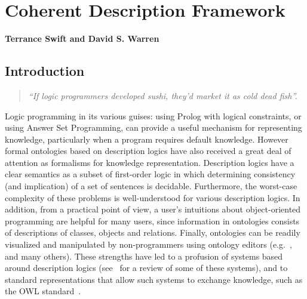 \newcommand{\pnot}{\mbox{$\backslash +$}}
\newcommand{\ourpreddomitem}[2]{
	\index{CDF predicates!#1}
	\index{domains!#1}
	\item[{\mbox{\tt #1}}]\hspace*{\fill}{\mbox{\sf #2}}\ \\}

\newcommand{\ourpreditem}[1]{\item[{\mbox{\tt #1}}] \index{predicates!#1}\ \\}

\chapter{Coherent Description Framework}
%
\begin{center} 
{\bf Terrance Swift and David S. Warren}
\end{center}

\section{Introduction}

\begin{quote}
{\it  ``If logic programmers developed sushi, they'd market it as
cold dead fish''.} 
\end{quote}

Logic programming in its various guises: using Prolog with logical
constraints, or using Answer Set Programming, can provide a useful
mechanism for representing knowledge, particularly when a program
requires default knowledge.  However formal ontologies based on
description logics have also received a great deal of attention as
formalisms for knowledge representation.  Description logics have a
clear semantics as a subset of first-order logic in which determining
consistency (and implication) of a set of sentences is decidable.
Furthermore, the worst-case complexity of these problems is
well-understood for various description logics.  In addition, from a
practical point of view, a user's intuitions about object-oriented
programming are helpful for many users, since information in
ontologies consists of descriptions of classes, objects and relations.
Finally, ontologies can be readily visualized and manipulated by
non-programmers using ontology editors (e.g.~\cite{protege}, and many
others).  These strengths have led to a profusion of systems based
around description logics (see~\cite{MolH03} for a review of some of
these systems), and to standard representations that allow such
systems to exchange knowledge, such as the OWL standard~\cite{SMVW02}.

